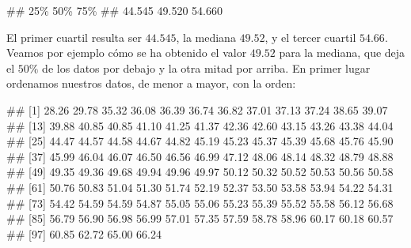 \documentclass[
  title=normal,
  notoc,
  nobib,
  degree=mecinf]{mnye}
\newenvironment{Shaded}{\begin{snugshade}}{\end{snugshade}}
\newcommand{\AttributeTok}[1]{\textcolor[rgb]{0.77,0.63,0.00}{#1}}
\newcommand{\FloatTok}[1]{\textcolor[rgb]{0.00,0.00,0.81}{#1}}
\newcommand{\FunctionTok}[1]{\textcolor[rgb]{0.00,0.00,0.00}{#1}}
\newcommand{\NormalTok}[1]{#1}
\newcommand{\SpecialCharTok}[1]{\textcolor[rgb]{0.00,0.00,0.00}{#1}}
\begin{document}
\begin{Shaded}
\end{Shaded}

\begin{Shaded}
\begin{Highlighting}[]
\NormalTok{\#\#    25\%    50\%    75\% }
\NormalTok{\#\# 44.545 49.520 54.660}
\end{Highlighting}
\end{Shaded}

El primer cuartil resulta ser \(44.545\), la mediana \(49.52\), y el tercer cuartil \(54.66\). Veamos por ejemplo cómo se ha obtenido el valor \(49.52\) para la mediana, que deja el \(50\%\) de los datos por debajo y la otra mitad por arriba. En primer lugar ordenamos nuestros datos, de menor a mayor, con la orden:

\begin{Shaded}
\end{Shaded}

\begin{Shaded}
\begin{Highlighting}[]
\NormalTok{\#\#   [1] 28.26 29.78 35.32 36.08 36.39 36.74 36.82 37.01 37.13 37.24 38.65 39.07}
\NormalTok{\#\#  [13] 39.88 40.85 40.85 41.10 41.25 41.37 42.36 42.60 43.15 43.26 43.38 44.04}
\NormalTok{\#\#  [25] 44.47 44.57 44.58 44.67 44.82 45.19 45.23 45.37 45.39 45.68 45.76 45.90}
\NormalTok{\#\#  [37] 45.99 46.04 46.07 46.50 46.56 46.99 47.12 48.06 48.14 48.32 48.79 48.88}
\NormalTok{\#\#  [49] 49.35 49.36 49.68 49.94 49.96 49.97 50.12 50.32 50.52 50.53 50.56 50.58}
\NormalTok{\#\#  [61] 50.76 50.83 51.04 51.30 51.74 52.19 52.37 53.50 53.58 53.94 54.22 54.31}
\NormalTok{\#\#  [73] 54.42 54.59 54.59 54.87 55.05 55.06 55.23 55.39 55.52 55.58 56.12 56.68}
\NormalTok{\#\#  [85] 56.79 56.90 56.98 56.99 57.01 57.35 57.59 58.78 58.96 60.17 60.18 60.57}
\NormalTok{\#\#  [97] 60.85 62.72 65.00 66.24}
\end{Highlighting}
\end{Shaded}
\end{document}
